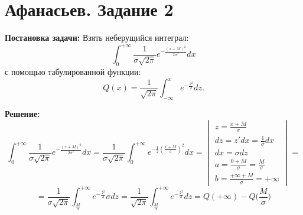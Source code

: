 \section{Афанасьев. Задание 2}

\textbf{Постановка задачи:}
Взять неберущийся интеграл:
$$\int_{0}^{+ \infty}{ \frac{1}{ \sigma \sqrt{2 \pi}} e^{-
\frac{(x+M)^2}{2 \sigma^2}} dx}$$
с помощью табулированной функции:
$$Q(x)= \frac{1}{ \sqrt{2 \pi}} \int_{- \infty}^{x}{e^{-
\frac{z^2}{2}} dz}.$$

\textbf{Решение:}
$$
\int_{0}^{+ \infty}{ \frac{1}{ \sigma \sqrt{2 \pi}} e^{-
\frac{(x+M)^2}{2 \sigma^2}} dx}=
\frac{1}{ \sigma \sqrt{2 \pi}} \int_{0}^{+ \infty}{e^{-
\frac{1}{2} ( \frac{x+M}{ \sigma})^2} dx}=
\begin{vmatrix}
z= \frac{x+M}{ \sigma} \\
dz=z' dx= \frac{1}{ \sigma} dx \\
dx= \sigma dz \\
a= \frac{0+M}{ \sigma}= \frac{M}{ \sigma} \\
b= \frac{+ \infty +M}{ \sigma}=+ \infty
\end{vmatrix}=
$$
$$
=\frac{1}{ \sigma \sqrt{2 \pi}} \int_{ \frac{M}{ \sigma}}^{+ \infty}{e^{-
\frac{z^2}{2}} \sigma dz}=
\frac{1}{ \sqrt{2 \pi}} \int_{ \frac{M}{ \sigma}}^{+ \infty}{e^{-
\frac{z^2}{2}} dz}=
Q(+ \infty)-Q \bigg ( \frac{M}{ \sigma} \bigg )
$$
